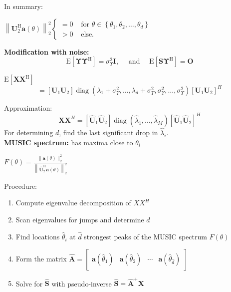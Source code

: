 \documentclass[english]{latex4ei/latex4ei_sheet}
\begin{document}
\begin{sectionbox}
In summary:
\begin{emphbox}
  $\left\|\boldsymbol{U}_{2}^{\mathrm{H}} \boldsymbol{a}(\theta)\right\|_{2}^{2} \begin{cases}=0 & \text { for } \theta \in\left\{\theta_{1}, \theta_{2}, \ldots, \theta_{d}\right\} \\ >0 & \text { else. }\end{cases}$
\end{emphbox}

\textbf{Modification with noise:}
$$\mathrm{E}\left[\boldsymbol{\Upsilon} \boldsymbol{\Upsilon}^{\mathrm{H}}\right]=\sigma_{\Upsilon}^{2} \mathbf{I}, \quad \text { and } \quad \mathrm{E}\left[\boldsymbol{S} \boldsymbol{\Upsilon}^{\mathrm{H}}\right]=\mathbf{O}$$

$\mathrm{E}\left[\boldsymbol{X} \boldsymbol{X}^{\mathrm{H}}\right]$
$$= [\boldsymbol{U}_1 \boldsymbol{U}_2] \operatorname{diag}(\lambda_1+\sigma_{\Upsilon}^2, \dots, \lambda_d+\sigma_{\Upsilon}^2,\sigma_{\Upsilon}^2,\dots,\sigma_{\Upsilon}^2)[\boldsymbol{U}_1 \boldsymbol{U}_2]^H$$

Approximation:
$$\boldsymbol{X}\boldsymbol{X}^H = [\hat{\boldsymbol{U}}_1 \hat{\boldsymbol{U}}_2]\operatorname{diag}(\hat{\lambda}_1,\dots,\hat{\lambda}_M)[\hat{\boldsymbol{U}}_1 \hat{\boldsymbol{U}}_2]^H$$
For determining $d$, find the last significant drop in $\hat{\lambda}_i$.\\

\textbf{MUSIC spectrum:} has maxima close to $\theta_i$
\begin{emphbox}
  $F(\theta)=\frac{\|\boldsymbol{a}(\theta)\|_{2}^{2}}{\left\|\widehat{\boldsymbol{U}}_{2}^{\mathrm{H}} \boldsymbol{a}(\theta)\right\|_{2}^{2}}$
\end{emphbox}


Procedure:
\begin{enumerate}
  \item Compute eigenvalue decomposition of $XX^H$
  \item Scan eigenvalues for jumps and determine $\hat{d}$
  \item Find locations $\hat{\theta}_i$ at $\hat{d}$ strongest peaks of the MUSIC spectrum $F(\theta)$
  \item Form the matrix $\widehat{\boldsymbol{A}}=\left[\begin{array}{llll}
    \boldsymbol{a}\left(\widehat{\theta}_{1}\right) & \boldsymbol{a}\left(\widehat{\theta}_{2}\right) & \cdots & \boldsymbol{a}\left(\widehat{\theta}_{\widehat{d}}\right)
    \end{array}\right]$
  \item Solve for $\hat{\boldsymbol{S}}$ with pseudo-inverse $\hat{\boldsymbol{S}} = \hat{\boldsymbol{A}}^+\boldsymbol{X}$
\end{enumerate}


\end{sectionbox}
\end{document}
